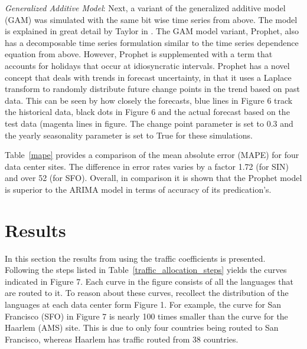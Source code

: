     
    
    \emph{Generalized Additive Model}: Next, a variant of the generalized additive model (GAM) was simulated with the same bit wise time series from above. The model is explained in great detail by Taylor in \cite{fbprophet}. The GAM model variant, Prophet, also has a decomposable time series formulation similar to the time series dependence equation from above. However, Prophet is supplemented with a term that accounts for holidays that occur at idiosyncratic  intervals. Prophet has a novel concept that deals with trends in forecast uncertainty, in that it uses a Laplace transform to randomly distribute future change points in the trend based on past data. This can be seen by how closely the forecasts, blue lines in Figure 6 track the historical data, black dots in Figure 6 and the actual forecast based on the test data (magenta lines in figure. The change point parameter is set to 0.3 and the yearly seasonality parameter is set to True for these simulations. 
    
    
    
    Table~\ref{mape} provides a comparison of the mean absolute error (MAPE) for four data center sites. The difference in error rates varies by a factor 1.72 (for SIN) and over 52 (for SFO). Overall, in comparison it is shown that the Prophet model is superior to the ARIMA model in terms of accuracy of its predication's. 
    
    
\section {Results}

    In this section the results from using the traffic coefficients is presented. Following the steps listed in Table~\ref{traffic_allocation_steps} yields the curves indicated in Figure 7. Each curve in the figure consists of all the languages that are routed to it. To reason about these curves, recollect the distribution of the languages at each data center form Figure 1. For example, the curve for San Francisco (SFO) in Figure 7 is nearly 100 times smaller than the curve for the Haarlem (AMS) site. This is due to only four countries being routed to San Francisco, whereas Haarlem has traffic routed from 38 countries. 